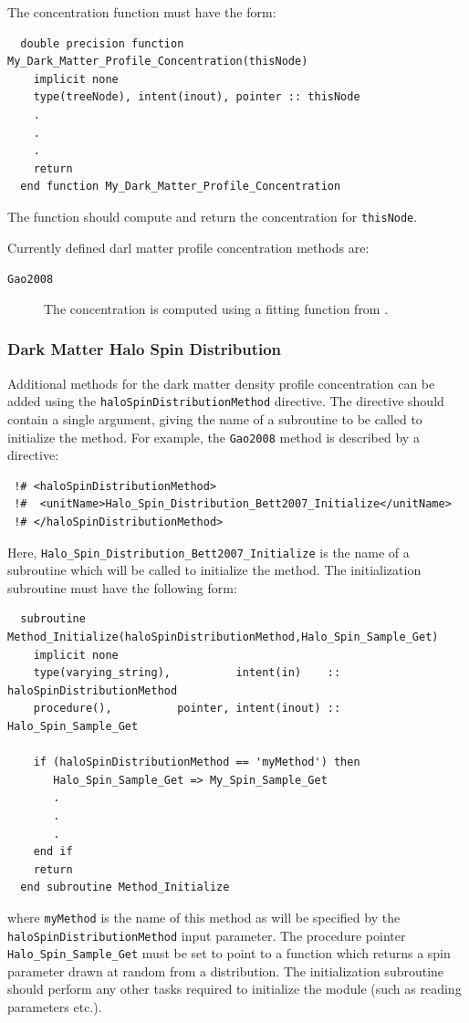 The concentration function must have the form:
\begin{verbatim}
  double precision function My_Dark_Matter_Profile_Concentration(thisNode)
    implicit none
    type(treeNode), intent(inout), pointer :: thisNode
    .
    .
    .
    return
  end function My_Dark_Matter_Profile_Concentration
\end{verbatim}
The function should compute and return the concentration for {\tt thisNode}.

Currently defined darl matter profile concentration methods are:
\begin{description}
 \item [{\tt Gao2008}] The concentration is computed using a fitting function from \cite{gao_redshift_2008}.
\end{description}

\subsubsection{Dark Matter Halo Spin Distribution}\label{sec:HaloSpinDistribution}

Additional methods for the dark matter density profile concentration can be added using the {\tt haloSpinDistributionMethod} directive. The directive should contain a single argument, giving the name of a subroutine to be called to initialize the method. For example, the {\tt Gao2008} method is described by a directive:
\begin{verbatim}
 !# <haloSpinDistributionMethod>
 !#  <unitName>Halo_Spin_Distribution_Bett2007_Initialize</unitName>
 !# </haloSpinDistributionMethod>
\end{verbatim}
Here, {\tt Halo\_Spin\_Distribution\_Bett2007\_Initialize} is the name of a subroutine which will be called to initialize the method. The initialization subroutine must have the following form:
\begin{verbatim}
  subroutine Method_Initialize(haloSpinDistributionMethod,Halo_Spin_Sample_Get)
    implicit none
    type(varying_string),          intent(in)    :: haloSpinDistributionMethod
    procedure(),          pointer, intent(inout) :: Halo_Spin_Sample_Get
    
    if (haloSpinDistributionMethod == 'myMethod') then
       Halo_Spin_Sample_Get => My_Spin_Sample_Get
       .
       .
       .
    end if
    return
  end subroutine Method_Initialize
\end{verbatim}
where {\tt myMethod} is the name of this method as will be specified by the {\tt haloSpinDistributionMethod} input parameter. The procedure pointer {\tt Halo\_Spin\_Sample\_Get} must be set to point to a function which returns a spin parameter drawn at random from a distribution. The initialization subroutine should perform any other tasks required to initialize the module (such as reading parameters etc.).

